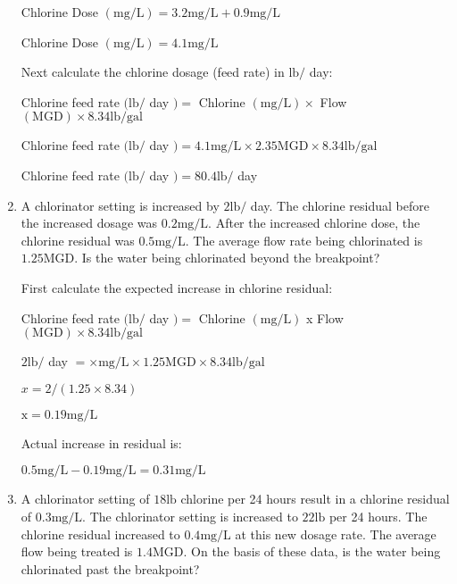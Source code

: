 \documentclass{article}
\begin{document}
\begin{enumerate}
Chlorine Dose $(\mathrm{mg} / \mathrm{L})=3.2 \mathrm{mg} / \mathrm{L}+0.9 \mathrm{mg} / \mathrm{L}$

Chlorine Dose $(\mathrm{mg} / \mathrm{L})=4.1 \mathrm{mg} / \mathrm{L}$

Next calculate the chlorine dosage (feed rate) in $\mathrm{lb} /$ day:

Chlorine feed rate $(\mathrm{lb} /$ day $)=$ Chlorine $(\mathrm{mg} / \mathrm{L}) \times$ Flow $(\mathrm{MGD}) \times 8.34 \mathrm{lb} / \mathrm{gal}$

Chlorine feed rate $(\mathrm{lb} /$ day $)=4.1 \mathrm{mg} / \mathrm{L} \times 2.35 \mathrm{MGD} \times 8.34 \mathrm{lb} / \mathrm{gal}$

Chlorine feed rate $(\mathrm{lb} /$ day $)=80.4 \mathrm{lb} /$ day


\item A chlorinator setting is increased by $2 \mathrm{lb} /$ day. The chlorine residual before the increased dosage was $0.2 \mathrm{mg} / \mathrm{L}$. After the increased chlorine dose, the chlorine residual was $0.5 \mathrm{mg} / \mathrm{L}$. The average flow rate being chlorinated is $1.25 \mathrm{MGD}$. Is the water being chlorinated beyond the breakpoint?

First calculate the expected increase in chlorine residual:

Chlorine feed rate $(\mathrm{lb} /$ day $)=$ Chlorine $(\mathrm{mg} / \mathrm{L})$ x Flow $(\mathrm{MGD}) \times 8.34 \mathrm{lb} / \mathrm{gal}$

$2 \mathrm{lb} /$ day $=\times \mathrm{mg} / \mathrm{L} \times 1.25 \mathrm{MGD} \times 8.34 \mathrm{lb} / \mathrm{gal}$

$x=2 /(1.25 \times 8.34)$

$\mathrm{x}=0.19 \mathrm{mg} / \mathrm{L}$

Actual increase in residual is:

$0.5 \mathrm{mg} / \mathrm{L}-0.19 \mathrm{mg} / \mathrm{L}=0.31 \mathrm{mg} / \mathrm{L}$

\item A chlorinator setting of $18 \mathrm{lb}$ chlorine per 24 hours result in a chlorine residual of $0.3 \mathrm{mg} / \mathrm{L}$. The chlorinator setting is increased to $22 \mathrm{lb}$ per 24 hours. The chlorine residual increased to $0.4 \mathrm{mg} / \mathrm{L}$ at this new dosage rate. The average flow being treated is $1.4 \mathrm{MGD}$. On the basis of these data, is the water being chlorinated past the breakpoint?


\end{enumerate}
\end{document}
